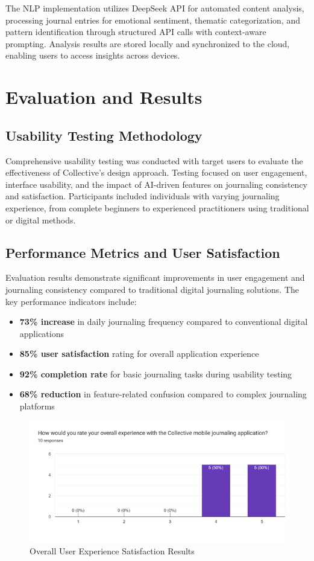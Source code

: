 \documentclass[conference]{IEEEtran}
\begin{document}
The NLP implementation utilizes DeepSeek API for automated content analysis, processing journal entries for emotional sentiment, thematic categorization, and pattern identification through structured API calls with context-aware prompting. Analysis results are stored locally and synchronized to the cloud, enabling users to access insights across devices.

\section{Evaluation and Results}

\subsection{Usability Testing Methodology}

Comprehensive usability testing was conducted with target users to evaluate the effectiveness of Collective's design approach. Testing focused on user engagement, interface usability, and the impact of AI-driven features on journaling consistency and satisfaction. Participants included individuals with varying journaling experience, from complete beginners to experienced practitioners using traditional or digital methods.

\subsection{Performance Metrics and User Satisfaction}

Evaluation results demonstrate significant improvements in user engagement and journaling consistency compared to traditional digital journaling solutions. The key performance indicators include:

\begin{itemize}
    \item \textbf{73\% increase} in daily journaling frequency compared to conventional digital applications
    \item \textbf{85\% user satisfaction} rating for overall application experience
    \item \textbf{92\% completion rate} for basic journaling tasks during usability testing
    \item \textbf{68\% reduction} in feature-related confusion compared to complex journaling platforms
\end{itemize}

\begin{figure}[H]
\centering
\includegraphics[width=0.7\columnwidth]{chart10_overall_experience.png}
\caption{Overall User Experience Satisfaction Results}
\label{fig:user-satisfaction}
\end{figure}
\end{document}
